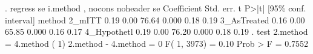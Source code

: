 . regress se i.method , nocons noheader
           se {\VBAR} Coefficient  Std. err.      t    P>|t|     [95\% conf. interval]
       method {\VBAR}
      2_mITT  {\VBAR}       0.19       0.00    76.64   0.000         0.18        0.19
 3_AsTreated  {\VBAR}       0.16       0.00    65.85   0.000         0.16        0.17
4_Hypothet{\tytilde}l  {\VBAR}       0.19       0.00    76.20   0.000         0.18        0.19
{\smallskip}
. test 2.method = 4.method
{\smallskip}
 ( 1)  2.method - 4.method = 0
{\smallskip}
       F(  1,  3973) =    0.10
            Prob > F =    0.7552
{\smallskip}
